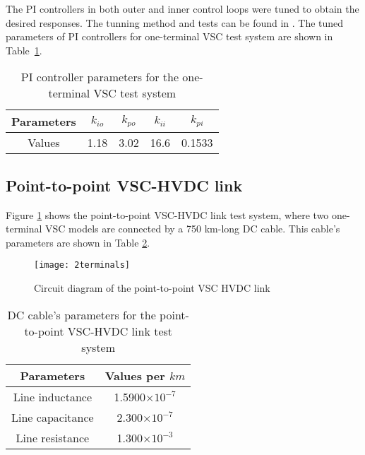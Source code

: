 \documentclass[conference]{IEEEtran}
\begin{document}
The PI controllers in both outer and inner control loops were tuned to obtain the desired responses. The tunning method and tests can be found in \cite{Rokib}. The tuned parameters of PI controllers for one-terminal VSC test system are shown in Table~\ref{oneterminalPI}.
\begin{table}[!ht]
\centering
\caption{PI controller parameters for the one-terminal VSC test system}
\begin{tabular}{| c | c | c | c | c | }
\hline
Parameters & $k_{io}$ & $k_{po}$ & $k_{ii}$ & $k_{pi}$ \\\hline
Values & 1.18 & 3.02 & 16.6 & 0.1533\\\hline
\end{tabular}
\label{oneterminalPI}
\end{table}
\subsection{Point-to-point VSC-HVDC link}
Figure \ref{2terminals} shows the point-to-point VSC-HVDC link test system, where two one-terminal VSC models are connected by a 750 km-long DC cable. This cable's parameters are shown in Table \ref{twoterminals}. 
\begin{figure}[!ht]
\centering
\texttt{[image: 2terminals]}
\caption{Circuit diagram of the point-to-point VSC HVDC link}
\label{2terminals}
\end{figure}
\begin{table}[!ht]
\centering
\caption{DC cable's parameters for the point-to-point VSC-HVDC link test system}
\begin{tabular}{| c | c | }
\hline
Parameters & Values per $km$   \\\hline
Line inductance & 1.5900$\times10^{-7}$\\\hline
Line capacitance & 2.300$\times10^{-7}$  \\\hline
Line resistance & 1.300$\times10^{-3}$ \\\hline
\end{tabular}
\label{twoterminals}
\end{table}
\end{document}
